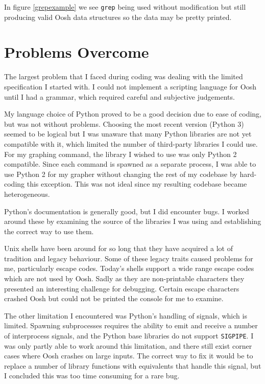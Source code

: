 \documentclass[12pt,twoside,notitlepage]{report}
\begin{document}
In figure \ref{grepexample} we see {\tt grep} being used without
modification but still producing valid Oosh data structures so the
data may be pretty printed.

\section{Problems Overcome}

The largest problem that I faced during coding was dealing with the limited
specification I started with. I could not implement a scripting
language for Oosh until I had a grammar, which required careful and
subjective judgements.

My language choice of Python proved to be a good decision due to ease
of coding, but was not without problems. Choosing the most recent
version (Python 3) seemed to be logical but I was unaware that many
Python libraries are not yet compatible with it, which limited the
number of third-party libraries I could use. For my graphing command,
the library I wished to use was only Python 2 compatible. Since each
command is spawned as a separate process, I was able to use Python 2
for my grapher without changing the rest of my codebase by hard-coding
this exception. This was not ideal since my resulting codebase became
heterogeneous.

Python's documentation is generally good, but I did encounter bugs. I
worked around these by examining the source of the libraries I was
using and establishing the correct way to use them.

Unix shells have been around for so long that they have acquired a lot
of tradition and legacy behaviour. Some of these legacy traits caused
problems for me, particularly escape codes. Today's shells support a
wide range escape codes which are not used by Oosh. Sadly as they are
non-printable characters they presented an interesting challenge for
debugging. Certain escape characters crashed Oosh but could not be
printed the console for me to examine.

The other limitation I encountered was Python's handling of signals,
which is limited. Spawning subprocesses requires the ability to emit
and receive a number of interprocess signals, and the Python base
libraries do not support {\tt SIGPIPE}. I was only partly able to work
around this limitation, and there still exist corner cases where Oosh
crashes on large inputs. The correct way to fix it would be to replace
a number of library functions with equivalents that handle this
signal, but I concluded this was too time consuming for a rare bug.
\end{document}
